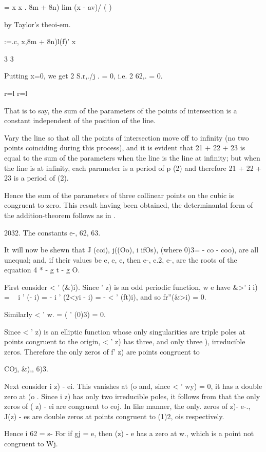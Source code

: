 {= x x . 8m + 8n) lim (x - av)/ ( )

by Taylor's theoi-em.

:=.c, x,8m + 8n)l(f)' x \

3 3

Putting x=0, we get 2 S.r,./j . = 0, i.e. 2 62,. = 0.

r=l r=l

That is to say, the sum of the parameters of the points of
intersection is a constant independent of the position of the line.

Vary the line so that all the points of intersection move off to
infinity (no two points coinciding during this process), and it is
evident that 21 + 22 + 23 is equal to the sum of the parameters when
the line is the line at infinity; but when the line is at infinity,
each parameter is a period of p (2) and therefore 21 + 22 + 23 is a
period of (2).

Hence the sum of the parameters of three collinear points on the cubic
is congruent to zero. This result having been obtained, the
determinantal form of the addition-theorem follows as in .

2032. The constants e-, 62, 63.

It will now be shewn that J (coi), j((Oo), i ifOs), (where 0)3= - co -
coo), are all unequal; and, if their values be e, e, e, then e-,
e.2, e-, are the roots of the equation 4 * - g t - g O.

First consider < ' (\&)i). Since ' z) is an odd periodic function, w e
have \&>' i i) = ~ i ' (- i) = - i ' (2<yi - i) = - < ' (ft)i), and so
fr''(\&>i) = 0.

Similarly < ' w. = ( ' (0)3) = 0.

Since < ' z) is an elliptic function whose only singularities are
triple poles at points congruent to the origin, < ' z) has three, and
only three ), irreducible zeros. Therefore the only zeros of
f' z) are points congruent to

COj, \&),, 6)3.

Next consider i z) - ei. This vanishes at (o and, since < ' wy) = 0,
it has a double zero at (o . Since i z) has only two irreducible
poles, it follows from  that the only zeros of ( z) - ei are
congruent to coj. In like manner, the only. zeros of z)- e-., J(z) -
es are double zeros at points congruent to (1)2, ois respectively.

Hence i 62 = s- For if gj = e, then (z) - e has a zero at w., which
is a point not congruent to Wj.

}
